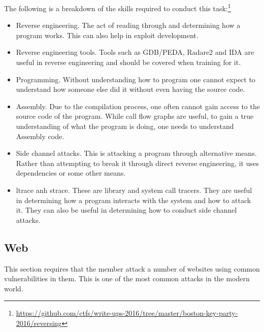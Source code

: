 \documentclass[a4paper,11pt]{report}
\begin{document}
			The following is a breakdown of the skills required to conduct this task:\footnote{\url{https://github.com/ctfs/write-ups-2016/tree/master/boston-key-party-2016/reversing}}
			\begin{itemize}
				\item Reverse engineering. 
					The act of reading through and determining how a program works. 
					This can also help in exploit development. 
				\item Reverse engineering tools. 
					Tools such as GDB/PEDA, Radare2 and IDA are useful in reverse engineering and should be covered when training for it. 
				\item Programming. 
					Without understanding how to program one cannot expect to understand how someone else did it without even having the source code. 
				\item Assembly. 
					Due to the compilation process, one often cannot gain access to the source code of the program. 
					While call flow graphs are useful, to gain a true understanding of what the program is doing, one needs to understand Assembly code. 
				\item Side channel attacks. 
					This is attacking a program through alternative means. 
					Rather than attempting to break it through direct reverse engineering, it uses dependencies or some other means. 
				\item ltrace anh strace. 
					These are library and system call tracers. 
					They are useful in determining how a program interacts with the system and how to attack it. 
					They can also be useful in determining how to conduct side channel attacks. 
			\end{itemize}
		\subsection{Web}
			This section requires that the member attack a number of websites using common vulnerabilities in them. 
			This is one of the most common attacks in the modern world. 
\end{document}
